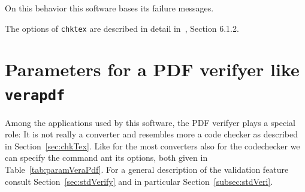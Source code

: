 On this behavior this software bases its failure messages. 

The options of \texttt{chktex} are described in detail 
in~\cite{ChkTeX22}, Section 6.1.2. %


\section{Parameters for a PDF verifyer like \texttt{verapdf}}\label{sec:verapdf}

Among the applications used by this software, 
the PDF verifyer plays a special role: 
It is not really a converter and resembles more a code checker as described in Section~\ref{sec:chkTex}. 
Like for the most converters also for the codechecker 
we can specify the command ant its options, both given in Table~\ref{tab:paramVeraPdf}. 
For a general description of the validation feature consult Section~\ref{sec:stdVerify} 
and in particular Section~\ref{subsec:stdVeri}.  


